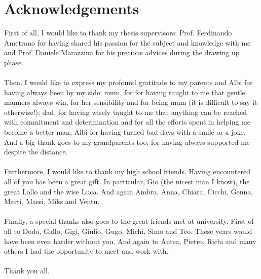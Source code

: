 \chapter{Acknowledgements}
\label{chpr:acknowledgement}
First of all, I would like to thank my thesis supervisors: Prof. Ferdinando Ametrano for having shared his passion for the subject and knowledge with me and Prof. Daniele Marazzina for his precious advices during the drawing up phase.\\ \ \\
Then, I would like to express my profound gratitude to my parents and Albi for having always been by my side: mum, for for having taught to me that gentle manners always win, for her sensibility and for being mum (it is difficult to say it otherwise!); dad, for having wisely taught to me that anything can be reached with commitment and determination and for all the efforts spent in helping me become a better man; Albi for having turned bad days with a smile or a joke. And a big thank goes to my grandparents too, for having always supported me despite the distance.\\ \ \\
Furthermore, I would like to thank my high school friends. Having encountered all of you has been a great gift. In particular, Gio (the nicest man I know), the great Lollo and the wise Luca. And again Ambra, Anna, Chiara, Cicchi, Genna, Marti, Massi, Miks and Ventu.\\ \ \\
Finally, a special thanks also goes to the great friends met at university. First of all to Dodo, Gallo, Gigi, Giulio, Gugo, Michi, Simo and Teo. These years would have been even harder without you. And again to Antea, Pietro, Richi and many others I had the opportunity to meet and work with.\\ \ \\
Thank you all.

